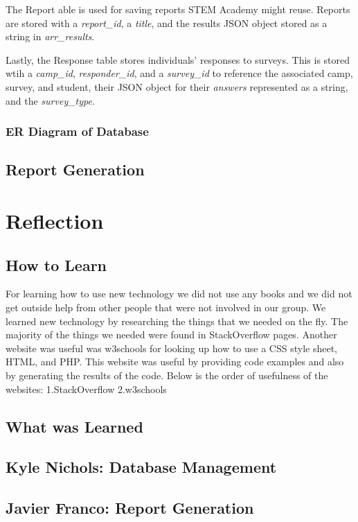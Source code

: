 \documentclass[letterpaper,10pt,serif,draftclsnofoot,onecolumn,compsoc,titlepage]{IEEEtran}
\begin{document}
The Report able is used for saving reports STEM Academy might reuse.
Reports are stored with a \emph{report\_id}, a \emph{title}, and the results JSON object stored as a string in \emph{arr\_results}.

Lastly, the Response table stores individuals' responses to surveys.
This is stored wtih a \emph{camp\_id}, \emph{responder\_id}, and a \emph{survey\_id} to reference the associated camp, survey, and student, their JSON object for their \emph{answers} represented as a string, and the \emph{survey\_type}.
\subsubsection{ER Diagram of Database}
\subsection{Report Generation}

\section{Reflection}
\subsection{How to Learn}
For learning how to use new technology we did not use any books and we did not get outside help from other people that were not involved in our group.
We learned new technology by researching the things that we needed on the fly.
The majority of the things we needed were found in StackOverflow pages.
Another website was useful was w3schools for looking up how to use a CSS style sheet, HTML, and PHP.
This website was useful by providing code examples and also by generating the results of the code. 
Below is the order of usefulness of the websites:
1.StackOverflow
2.w3schools
\subsection{What was Learned}

\subsection{Kyle Nichols: Database Management}
\subsection{Javier Franco: Report Generation}

%
%
\begin{appendices}

\end{appendices}
\end{document}
